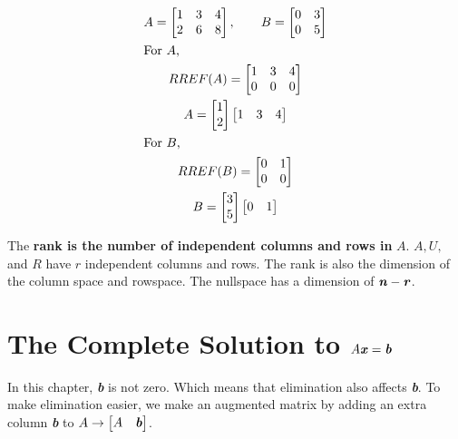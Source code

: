 \documentclass[12pt, letterpaper]{article}
\newcommand{\V}[1]{\textbf{\textit{#1}}}
\theoremstyle{definition}
\begin{document}
	
	\begin{gather*}
	A = \begin{bmatrix}
			1 & 3 & 4 \\
			2 & 6 & 8 
			\end{bmatrix}, \qquad B = \begin{bmatrix}
											0 & 3 \\
											0 & 5
											\end{bmatrix} \\
	\intertext{For $A$,}
		RREF(A) = \begin{bmatrix}
					1 & 3 & 4 \\
					0 & 0 & 0
					\end{bmatrix} \\
		A = \begin{bmatrix} 1\\ 2 \end{bmatrix} \begin{bmatrix} 1 & 3 & 4 \end{bmatrix} \\
	\intertext{For $B$,}
		RREF(B) = \begin{bmatrix}
					0 & 1 \\
					0 & 0
					\end{bmatrix} \\
		B = \begin{bmatrix} 3\\ 5 \end{bmatrix} \begin{bmatrix} 0 & 1 \end{bmatrix}
	\end{gather*}
	
	The \textbf{rank is the number of independent columns and rows in} $A$. $A, U,$ and $R$ have $r$ independent columns and rows. The rank is also the dimension of the column space and rowspace. The nullspace has a dimension of $\V{n} - \V{r}$.
	
	
\section{The Complete Solution to $A\V{x} = \V{b}$}
	In this chapter, \V{b} is not zero. Which means that elimination also affects \V{b}. To make elimination easier, we make an augmented matrix by adding an extra column \V{b} to $A \rightarrow \begin{bmatrix} A & \V{b}\end{bmatrix}$.
	
\end{document}
